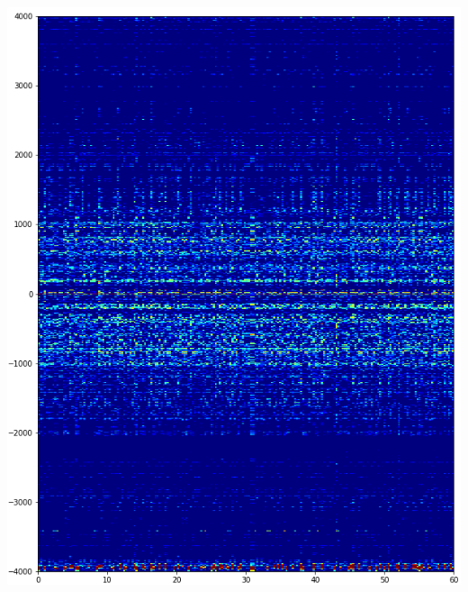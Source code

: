\documentclass[a0,portrait]{a0poster}
\begin{document}
\begin{multicols}{2}
\begin{tcolorbox}[colback=blue!5!white,colframe=blue!75!black,title,title={\section*{Résultats}}]
\begin{minipage}{0.2\textwidth}
    \includegraphics[width=1.0\textwidth]{./iter=60000.png}
\end{minipage}%
\begin{minipage}{0.2\textwidth}

\end{minipage}
\end{tcolorbox}
\end{multicols}
\end{document}

